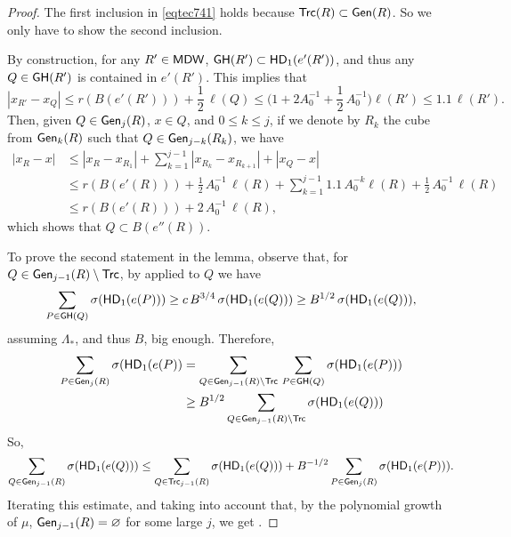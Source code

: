 \begin{proof}

The first inclusion in \eqref{eqtec741} holds because ${\mathsf{Trc}}(R)\subset{\mathsf {Gen}}(R)$. So we only have to show the second inclusion.

By construction, for any $R'\in{\mathsf{MDW}}$, ${\mathsf{GH}}(R')\subset {\mathsf{HD}}_1(e'(R'))$, and thus any $Q\in {\mathsf{GH}}(R')$ is contained in $e'(R')$. This implies that 
$$|x_{R'}-x_Q|\leq r(B(e'(R'))) + \frac12\,\ell(Q)\leq  \Big(1+ 2A_0^{-1}+ \frac12\,A_0^{-1}\Big)\ell(R') \leq 1.1\,\ell(R').$$
Then, given $Q\in{\mathsf {Gen}}_j(R)$, $x\in Q$, and $0\leq k\leq j$, if we denote by $R_k$ the cube from ${\mathsf {Gen}}_k(R)$ such that $Q\in{\mathsf {Gen}}_{j-k}(R_k)$, we have
\begin{align*}
|x_R-x|& \leq |x_R- x_{R_1}|+ \sum_{k=1}^{j-1} |x_{R_k}- x_{R_{k+1}}| + |x_Q-x|\\
& \leq r(B(e'(R)))+ \frac12\,A_0^{-1}\,\ell(R) + \sum_{k=1}^{j-1}1.1\,A_0^{-k}\ell(R) + \frac12\,A_0^{-1}\,\ell(R)\\
& \leq r(B(e'(R)))+ 2\,A_0^{-1}\,\ell(R),
\end{align*}
which shows that $Q\subset B(e''(R))$.

To prove the second statement in the lemma, observe that, for $Q\in{\mathsf {Gen}}_{j-1}(R)\setminus {\mathsf{Trc}}$,
by  applied to $Q$ we have
$$\sum_{P\in{\mathsf{GH}}(Q)} \sigma({\mathsf{HD}}_1(e(P))) \geq c\,B^{3/4}\,\sigma({\mathsf{HD}}_1(e(Q)))\geq 
B^{1/2}\,\sigma({\mathsf{HD}}_1(e(Q))),
$$
assuming $\Lambda_*$, and thus $B$, big enough. Therefore,
\begin{align*}
\sum_{P\in{\mathsf {Gen}}_j(R)}\sigma({\mathsf{HD}}_1(e(P))
& = 
\sum_{Q\in{\mathsf {Gen}}_{j-1}(R)\setminus {\mathsf{Trc}}} \,\sum_{P\in{\mathsf{GH}}(Q)}\sigma({\mathsf{HD}}_1(e(P)))\\
& \geq 
B^{1/2}\sum_{Q\in{\mathsf {Gen}}_{j-1}(R)\setminus {\mathsf{Trc}}}\sigma({\mathsf{HD}}_1(e(Q)))
\end{align*}
So,
$$\sum_{Q\in{\mathsf {Gen}}_{j-1}(R)}\sigma({\mathsf{HD}}_1(e(Q)))\leq 
\sum_{Q\in{\mathsf{Trc}}_{j-1}(R)}\sigma({\mathsf{HD}}_1(e(Q))) +
B^{-1/2}\sum_{P\in{\mathsf {Gen}}_j(R)}\sigma({\mathsf{HD}}_1(e(P))).
$$
Iterating this estimate, and taking into account that, by the polynomial growth of $\mu$,
${\mathsf {Gen}}_{j-1}(R)=\varnothing$ for some large $j$, we get .
\end{proof}

\vv


